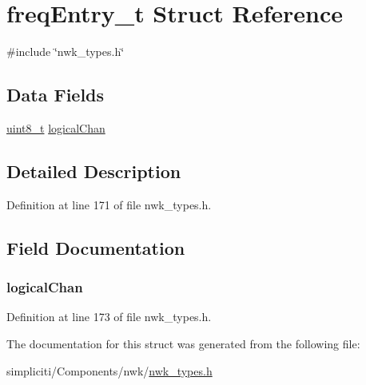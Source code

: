 \hypertarget{structfreqEntry__t}{\section{freq\-Entry\-\_\-t \-Struct \-Reference}
\label{structfreqEntry__t}
}


{\ttfamily \#include \char`\"{}nwk\-\_\-types.\-h\char`\"{}}

\subsection*{\-Data \-Fields}
\begin{DoxyCompactItemize}
\item 
\hyperlink{bsp__msp430__defs_8h_aba7bc1797add20fe3efdf37ced1182c5}{uint8\-\_\-t} \hyperlink{structfreqEntry__t_afb2c0884696beb10e8d2813ad6765cbb}{logical\-Chan}
\end{DoxyCompactItemize}


\subsection{\-Detailed \-Description}


\-Definition at line 171 of file nwk\-\_\-types.\-h.



\subsection{\-Field \-Documentation}
\hypertarget{structfreqEntry__t_afb2c0884696beb10e8d2813ad6765cbb}{
\subsubsection[{logical\-Chan}]{ {\bf logical\-Chan}}}\label{structfreqEntry__t_afb2c0884696beb10e8d2813ad6765cbb}


\-Definition at line 173 of file nwk\-\_\-types.\-h.



\-The documentation for this struct was generated from the following file\-:\begin{DoxyCompactItemize}
\item 
simpliciti/\-Components/nwk/\hyperlink{nwk__types_8h}{nwk\-\_\-types.\-h}\end{DoxyCompactItemize}
